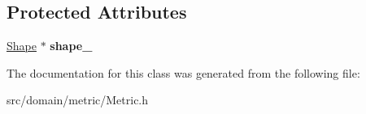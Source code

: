 \subsection*{Protected Attributes}
\begin{DoxyCompactItemize}
\item 
\hypertarget{class_metric_adce68fb48ab77652ccab3dc7b017ea7c}{}\hyperlink{class_shape}{Shape} $\ast$ {\bfseries shape\+\_\+}\label{class_metric_adce68fb48ab77652ccab3dc7b017ea7c}

\end{DoxyCompactItemize}


The documentation for this class was generated from the following file\+:\begin{DoxyCompactItemize}
\item 
src/domain/metric/Metric.\+h\end{DoxyCompactItemize}
